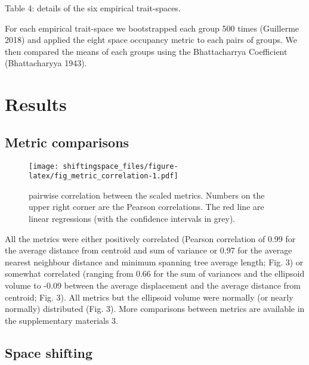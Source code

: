 \documentclass[]{article}
\begin{document}
\renewcommand\baselinestretch{2}\selectfont

Table 4: details of the six empirical trait-spaces.

For each empirical trait-space we bootstrapped each group 500 times
(Guillerme 2018) and applied the eight space occupancy metric to each
pairs of groups. We then compared the means of each groups using the
Bhattacharrya Coefficient (Bhattacharyya 1943).

\section{Results}\label{results}

\subsection{Metric comparisons}\label{metric-comparisons-1}

\begin{figure}
\centering
\texttt{[image: shiftingspace\_files/figure-latex/fig\_metric\_correlation-1.pdf]}
\caption{pairwise correlation between the scaled metrics.
Numbers on the upper right corner are the Pearson correlations. The red
line are linear regressions (with the confidence intervals in grey).}
\end{figure}

All the metrics were either positively correlated (Pearson correlation
of 0.99 for the average distance from centroid and sum of variance or
0.97 for the average nearest neighbour distance and minimum spanning
tree average length; Fig. 3) or somewhat correlated (ranging from 0.66
for the sum of variances and the ellipsoid volume to -0.09 between the
average displacement and the average distance from centroid; Fig. 3).
All metrics but the ellipsoid volume were normally (or nearly normally)
distributed (Fig. 3). More comparisons between metrics are available in
the supplementary materials 3.

\subsection{Space shifting}\label{space-shifting}

\renewcommand\baselinestretch{1}\selectfont
\end{document}
